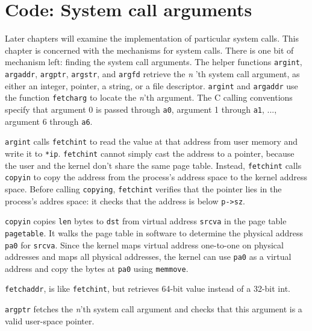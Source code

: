 \section{Code: System call arguments}

Later chapters will examine the implementation of
particular system calls.
This chapter is concerned with the mechanisms for system calls.
There is one bit of mechanism left: finding the system call arguments.
The helper functions
\lstinline{argint},
\lstinline{argaddr},
\lstinline{argptr},
\lstinline{argstr},
and
\lstinline{argfd}
retrieve the 
\textit{n} 'th 
system call
argument, as either an integer, pointer, a string, or a file descriptor.
\lstinline{argint}
and
\lstinline{argaddr}
use the function
\lstinline{fetcharg}
to locate the
\textit{n}'th 
argument. The C calling conventions specify that argument 0 is passed
through
\texttt{a0},
argument 1 through
\texttt{a1}, ...,
argument 6 through
\texttt{a6}.

\lstinline{argint} 
calls 
\lstinline{fetchint}
to read the value at that address from user memory and write it to
\lstinline{*ip}.  
\lstinline{fetchint}
cannot simply cast the address to a pointer, because the user and the
kernel don't share the same page table. Instead,
\lstinline{fetchint} calls \lstinline{copyin} to copy the address from the
process's address space to the kernel address space.  Before
calling \lstinline{copying}, \lstinline{fetchint}
verifies that the
pointer lies in the process's addres
space: it checks
that the address is below
\lstinline{p->sz}.

\lstinline{copyin}
 copies \lstinline{len} bytes to
\lstinline{dst} from virtual address \lstinline{srcva} in the page
table \lstinline{pagetable}.  It walks the page table in software to
determine the physical address \lstinline{pa0} for \lstinline{srcva}.
Since the kernel maps virtual address one-to-one on physical
addresses and maps all physical addresses, the kernel can use
\lstinline{pa0} as a virtual address and copy the bytes at
\lstinline{pa0} using \lstinline{memmove}.

\lstinline{fetchaddr},
is like
\lstinline{fetchint},
but retrieves 64-bit value instead of a 32-bit int.

\lstinline{argptr}
fetches the
\textit{n}'th 
system call argument and checks that this argument is a valid
user-space pointer.

